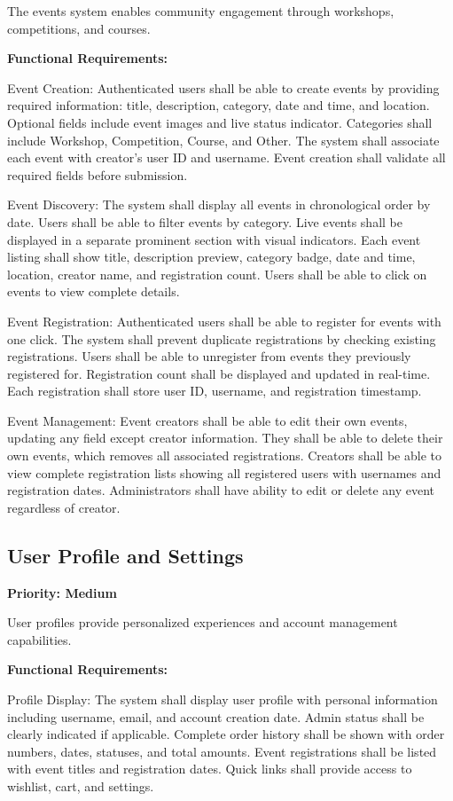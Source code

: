 ﻿\documentclass[11pt]{article}
\begin{document}
The events system enables community engagement through workshops, competitions, and courses.

\textbf{Functional Requirements:}

Event Creation: Authenticated users shall be able to create events by providing required information: title, description, category, date and time, and location. Optional fields include event images and live status indicator. Categories shall include Workshop, Competition, Course, and Other. The system shall associate each event with creator's user ID and username. Event creation shall validate all required fields before submission.

Event Discovery: The system shall display all events in chronological order by date. Users shall be able to filter events by category. Live events shall be displayed in a separate prominent section with visual indicators. Each event listing shall show title, description preview, category badge, date and time, location, creator name, and registration count. Users shall be able to click on events to view complete details.

Event Registration: Authenticated users shall be able to register for events with one click. The system shall prevent duplicate registrations by checking existing registrations. Users shall be able to unregister from events they previously registered for. Registration count shall be displayed and updated in real-time. Each registration shall store user ID, username, and registration timestamp.

Event Management: Event creators shall be able to edit their own events, updating any field except creator information. They shall be able to delete their own events, which removes all associated registrations. Creators shall be able to view complete registration lists showing all registered users with usernames and registration dates. Administrators shall have ability to edit or delete any event regardless of creator.

\subsection{User Profile and Settings}
\textbf{Priority: Medium}

User profiles provide personalized experiences and account management capabilities.

\textbf{Functional Requirements:}

Profile Display: The system shall display user profile with personal information including username, email, and account creation date. Admin status shall be clearly indicated if applicable. Complete order history shall be shown with order numbers, dates, statuses, and total amounts. Event registrations shall be listed with event titles and registration dates. Quick links shall provide access to wishlist, cart, and settings.
\end{document}
